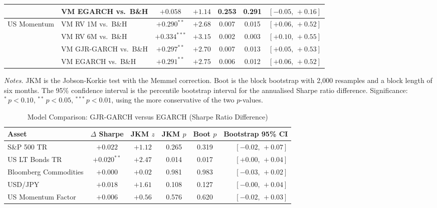 \documentclass[12pt, a4paper]{article}
\begin{document}
\begin{table}[H]
\begin{tabular}{llccccr}
      & VM EGARCH vs.\ B\&H       & $+0.058$ & $+1.14$ & 0.253 & 0.291 & $[-0.05,\,+0.16]$ \\
    \midrule
    \multirow{4}{*}{US Momentum}
      & VM RV 1M vs.\ B\&H        & $+0.290^{**}$  & $+2.68$ & 0.007 & 0.015 & $[+0.06,\,+0.52]$ \\
      & VM RV 6M vs.\ B\&H        & $+0.334^{***}$ & $+3.15$ & 0.002 & 0.003 & $[+0.10,\,+0.55]$ \\
      & VM GJR-GARCH vs.\ B\&H    & $+0.297^{**}$  & $+2.70$ & 0.007 & 0.013 & $[+0.05,\,+0.53]$ \\
      & VM EGARCH vs.\ B\&H       & $+0.291^{**}$  & $+2.75$ & 0.006 & 0.012 & $[+0.06,\,+0.52]$ \\
    \bottomrule
  \end{tabular}
  \begin{minipage}{\textwidth}
    \vspace{2pt}
    \footnotesize\textit{Notes.} JKM is the Jobson-Korkie test with the Memmel correction.
    Boot is the block bootstrap with 2,000 resamples and a block length of six months.
    The 95\% confidence interval is the percentile bootstrap interval for the annualised
    Sharpe ratio difference. Significance: $^{*}\, p<0.10$, $^{**}\, p<0.05$,
    $^{***}\, p<0.01$, using the more conservative of the two $p$-values.
  \end{minipage}
\end{table}

\begin{table}[H]
  \centering
  \caption{Model Comparison: GJR-GARCH versus EGARCH (Sharpe Ratio Difference)}
  \label{tab:sr_garch_egarch}
  \small
  \begin{tabular}{lccccr}
    \toprule
    \textbf{Asset}
      & \textbf{$\Delta$ Sharpe} & \textbf{JKM $z$} & \textbf{JKM $p$}
      & \textbf{Boot $p$} & \textbf{Bootstrap 95\% CI} \\
    \midrule
    S\&P 500 TR              & $+0.022$       & $+1.12$ & 0.265 & 0.319 & $[-0.02,\,+0.07]$ \\
    US LT Bonds TR           & $+0.020^{**}$  & $+2.47$ & 0.014 & 0.017 & $[+0.00,\,+0.04]$ \\
    Bloomberg Commodities    & $+0.000$       & $+0.02$ & 0.981 & 0.983 & $[-0.03,\,+0.02]$ \\
    USD/JPY                  & $+0.018$       & $+1.61$ & 0.108 & 0.127 & $[-0.00,\,+0.04]$ \\
    US Momentum Factor       & $+0.006$       & $+0.56$ & 0.576 & 0.620 & $[-0.02,\,+0.03]$ \\
    \bottomrule
  \end{tabular}
\end{table}
\end{document}
